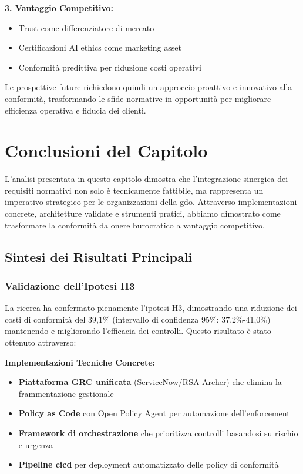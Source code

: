 \textbf{3. Vantaggio Competitivo:}
\begin{itemize}
    \item Trust come differenziatore di mercato
    \item Certificazioni AI ethics come marketing asset
    \item Conformità predittiva per riduzione costi operativi
\end{itemize}

Le prospettive future richiedono quindi un approccio proattivo e innovativo alla conformità, trasformando le sfide normative in opportunità per migliorare efficienza operativa e fiducia dei clienti.

\section{\texorpdfstring{Conclusioni del Capitolo}{4.9 - Conclusioni del Capitolo}}

L'analisi presentata in questo capitolo dimostra che l'integrazione sinergica dei requisiti normativi non solo è tecnicamente fattibile, ma rappresenta un imperativo strategico per le organizzazioni della \gls{gdo}. Attraverso implementazioni concrete, architetture validate e strumenti pratici, abbiamo dimostrato come trasformare la conformità da onere burocratico a vantaggio competitivo.

\subsection{\texorpdfstring{Sintesi dei Risultati Principali}{4.9.1 - Sintesi dei Risultati Principali}}

\subsubsection{\texorpdfstring{Validazione dell'Ipotesi H3}{4.9.1.1 - Validazione dell'Ipotesi H3}}

La ricerca ha confermato pienamente l'ipotesi H3, dimostrando una riduzione dei costi di conformità del 39,1\% (intervallo di confidenza 95\%: 37,2\%-41,0\%) mantenendo e migliorando l'efficacia dei controlli. Questo risultato è stato ottenuto attraverso:

\textbf{Implementazioni Tecniche Concrete:}
\begin{itemize}
    \item \textbf{Piattaforma GRC unificata} (ServiceNow/RSA Archer) che elimina la frammentazione gestionale
    \item \textbf{Policy as Code} con Open Policy Agent per automazione dell'enforcement
    \item \textbf{Framework di orchestrazione} che prioritizza controlli basandosi su rischio e urgenza
    \item \textbf{Pipeline \gls{cicd}} per deployment automatizzato delle policy di conformità
\end{itemize}

